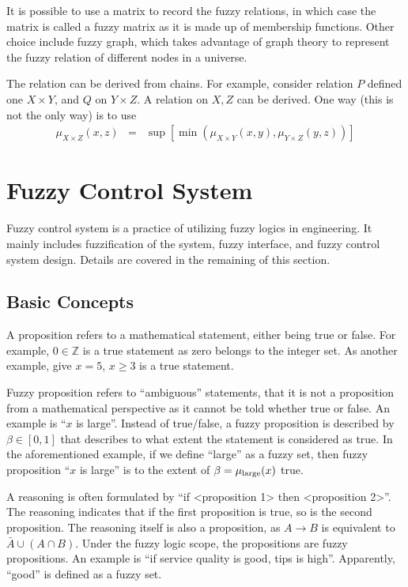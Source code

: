 It is possible to use a matrix to record the fuzzy relations, in which case the matrix is called a fuzzy matrix as it is made up of membership functions. Other choice include fuzzy graph, which takes advantage of graph theory to represent the fuzzy relation of different nodes in a universe.

The relation can be derived from chains. For example, consider relation $P$ defined one $X \times Y$, and $Q$ on $Y \times Z$. A relation on $X, Z$ can be derived. One way (this is not the only way) is to use
\begin{eqnarray}
	\mu_{X \times Z}(x, z) &=& \sup \left[\min\left(\mu_{X\times Y}(x, y), \mu_{Y\times Z} (y, z)\right)\right] \nonumber
\end{eqnarray}

\section{Fuzzy Control System}

Fuzzy control system is a practice of utilizing fuzzy logics in engineering. It mainly includes fuzzification of the system, fuzzy interface, and fuzzy control system design. Details are covered in the remaining of this section.

\subsection{Basic Concepts}

A proposition refers to a mathematical statement, either being true or false. For example, $0 \in \mathbb{Z}$ is a true statement as zero belongs to the integer set. As another example, give $x=5$, $x \geq 3$ is a true statement.

Fuzzy proposition refers to ``ambiguous'' statements, that it is not a proposition from a mathematical perspective as it cannot be told whether true or false. An example is ``$x$ is large''. Instead of true/false, a fuzzy proposition is described by $\beta \in [0, 1]$ that describes to what extent the statement is considered as true. In the aforementioned example, if we define ``large'' as a fuzzy set, then fuzzy proposition ``$x$ is large'' is to the extent of $\beta = \mu_{\textup{large}}(x)$ true.

A reasoning is often formulated by ``if <proposition 1> then <proposition 2>''. The reasoning indicates that if the first proposition is true, so is the second proposition. The reasoning itself is also a proposition, as $A \rightarrow B$ is equivalent to $\bar{A}\cup (A\cap B)$. Under the fuzzy logic scope, the propositions are fuzzy propositions. An example is ``if service quality is good, tips is high''. Apparently, ``good'' is defined as a fuzzy set.

